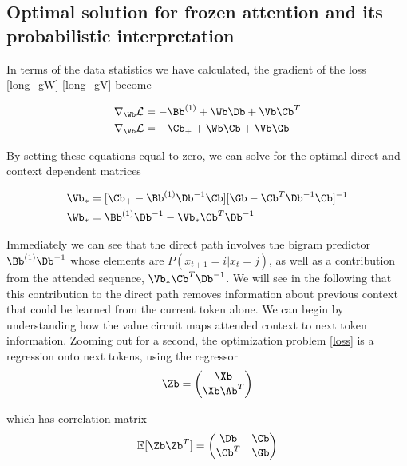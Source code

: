\documentclass{article}
\begin{document}

\subsection{Optimal solution for frozen attention and its probabilistic interpretation}
In terms of the data statistics we have calculated, the gradient of the loss \eqref{long_gW}-\eqref{long_gV} become 

\begin{align}
     \nabla_{\Wb}\mathcal{L} &= - \Bb^{(1)}+\Wb \Db + \Vb \Cb^T \label{gW}\\ 
     \nabla_{\Vb}\mathcal{L} &= - \Cb_{+} + \Wb\Cb + \Vb \Gb \label{gV}
\end{align}

By setting these equations equal to zero, we can solve for the optimal direct and context dependent matrices

\begin{align}
    \Vb_{*} &= [\Cb_+ - \Bb^{(1)}\Db^{-1}\Cb][\Gb - \Cb^T \Db^{-1}\Cb]^{-1} \label{vstar}\\
    \Wb_{*} &= \Bb^{(1)}\Db^{-1} - \Vb_* \Cb^T \Db^{-1}\label{wstar}
\end{align}

Immediately we can see that the direct path involves the bigram predictor $\Bb^{(1)}\Db^{-1}$ whose elements are $P(x_{t+1} = i | x_t = j)$, as well as a contribution from the attended sequence, $\Vb_* \Cb^T \Db^{-1}$. We will see in the following that this contribution to the direct path removes information about previous context that could be learned from the current token alone. We can begin by understanding how the value circuit maps attended context to next token information. Zooming out for a second, the optimization problem \eqref{loss} is a regression onto next tokens, using the regressor
\begin{equation}
\Zb = 
    \begin{pmatrix}
        \Xb \\
        \Xb\Ab^T
    \end{pmatrix}
\end{equation}

which has correlation matrix
\begin{equation}
\mathbb{E}[\Zb\Zb^T] = 
    \begin{pmatrix}
        \Db & \Cb \\
        \Cb^T & \Gb
    \end{pmatrix}
\end{equation}
\end{document}

